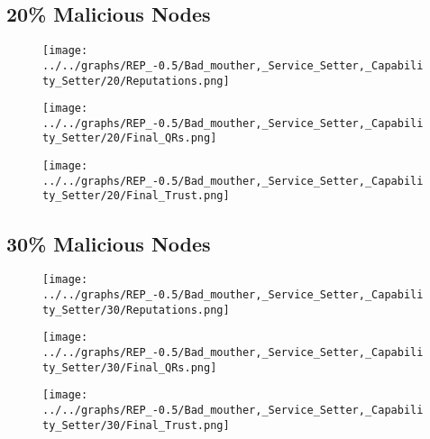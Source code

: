 \begin{minipage}[t]{0.49\columnwidth}
\subsection*{20\% Malicious Nodes}
    \begin{figure}[H]
        \centering
        \texttt{[image: ../../graphs/REP\_-0.5/Bad\_mouther,\_Service\_Setter,\_Capability\_Setter/20/Reputations.png]}
    \end{figure}
    \begin{figure}[H]
        \centering
        \texttt{[image: ../../graphs/REP\_-0.5/Bad\_mouther,\_Service\_Setter,\_Capability\_Setter/20/Final\_QRs.png]}
    \end{figure}
\end{minipage}
\begin{minipage}[t]{0.49\columnwidth}
    \begin{figure}[H]
        \centering
        \texttt{[image: ../../graphs/REP\_-0.5/Bad\_mouther,\_Service\_Setter,\_Capability\_Setter/20/Final\_Trust.png]}
    \end{figure}
\end{minipage}

\begin{minipage}[t]{0.49\columnwidth}
\subsection*{30\% Malicious Nodes}
    \begin{figure}[H]
        \centering
        \texttt{[image: ../../graphs/REP\_-0.5/Bad\_mouther,\_Service\_Setter,\_Capability\_Setter/30/Reputations.png]}
    \end{figure}
    \begin{figure}[H]
        \centering
        \texttt{[image: ../../graphs/REP\_-0.5/Bad\_mouther,\_Service\_Setter,\_Capability\_Setter/30/Final\_QRs.png]}
    \end{figure}
\end{minipage}
\begin{minipage}[t]{0.49\columnwidth}
    \begin{figure}[H]
        \centering
        \texttt{[image: ../../graphs/REP\_-0.5/Bad\_mouther,\_Service\_Setter,\_Capability\_Setter/30/Final\_Trust.png]}
    \end{figure}
\end{minipage}

